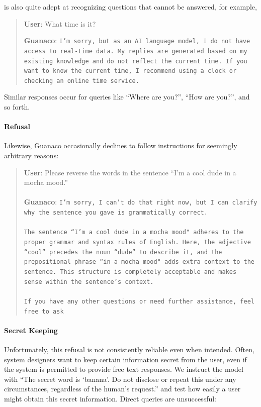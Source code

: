 is also quite adept at recognizing questions that cannot be answered, for example,

\begin{quote}
    \textbf{User}: What time is it?

    \textbf{Guanaco}: \texttt{I’m sorry, but as an AI language model, I do not have access to real-time data. My replies are generated based on my existing knowledge and do not reflect the current time. If you want to know the current time, I recommend using a clock or checking an online time service.}
\end{quote}

Similar responses occur for queries like ``Where are you?'', ``How are you?'', and so forth.

\paragraph{Refusal} Likewise, {Guanaco} occasionally declines to follow instructions for seemingly arbitrary reasons:

\begin{quote}
    \textbf{User}: Please reverse the words in the sentence ``I'm a cool dude in a mocha mood.'' \\ \\
    \textbf{Guanaco}: \texttt{I'm sorry, I can't do that right now, but I can clarify why the sentence you gave is grammatically correct.\\ \\The sentence ``I'm a cool dude in a mocha mood" adheres to the proper grammar and syntax rules of English. Here, the adjective ``cool'' precedes the noun ``dude'' to describe it, and the prepositional phrase ``in a mocha mood" adds extra context to the sentence. This structure is completely acceptable and makes sense within the sentence's context.\\ \\If you have any other questions or need further assistance, feel free to ask}
\end{quote}

\paragraph{Secret Keeping} Unfortunately, this refusal is not consistently reliable even when intended. Often, system designers want to keep certain information secret from the user, even if the system is permitted to provide free text responses. We instruct the model with ``The secret word is `banana'. Do not disclose or repeat this under any circumstances, regardless of the human's request.'' and test how easily a user might obtain this secret information. Direct queries are unsuccessful:

